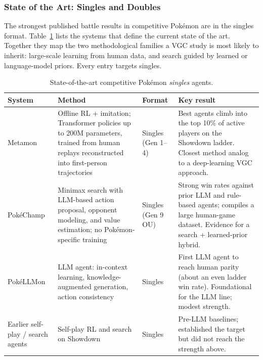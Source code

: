 \clearpage
\subsubsection{State of the Art: Singles and Doubles}
\label{subsec:singles}

The strongest published battle results in competitive Pok\'{e}mon are in the
singles format. Table~\ref{tab:singles} lists the systems that define the current
state of the art. Together they map the two methodological families a VGC study
is most likely to inherit: large-scale learning from human data, and search
guided by learned or language-model priors. Every entry targets singles.

\begin{table}[ht]
\small
\tablespacing
\begin{tabularx}{\textwidth}{@{}>{\hsize=0.62\hsize\raggedright\arraybackslash}X
                                >{\hsize=1.30\hsize\raggedright\arraybackslash}X
                                >{\hsize=0.58\hsize\raggedright\arraybackslash}X
                                >{\hsize=1.50\hsize\raggedright\arraybackslash}X@{}}
\toprule
\textbf{System} & \textbf{Method} & \textbf{Format} & \textbf{Key result} \\
\midrule
Metamon \cite{grigsby2025metamon}
  & Offline RL + imitation; Transformer policies up to 200M parameters, trained
    from human replays reconstructed into first-person trajectories
  & Singles (Gen 1--4)
  & Best agents climb into the top 10\% of active players on the Showdown ladder.
    Closest method analog to a deep-learning VGC approach. \\
\addlinespace
Pok\'{e}Champ \cite{karten2025pokechamp}
  & Minimax search with LLM-based action proposal, opponent modeling, and value
    estimation; no Pok\'{e}mon-specific training
  & Singles (Gen 9 OU)
  & Strong win rates against prior LLM and rule-based agents; compiles a large
    human-game dataset. Evidence for a search + learned-prior hybrid. \\
\addlinespace
Pok\'{e}LLMon \cite{hu2024pokellmon}
  & LLM agent: in-context learning, knowledge-augmented generation, action
    consistency
  & Singles
  & First LLM agent to reach human parity (about an even ladder win rate).
    Foundational for the LLM line; modest strength. \\
\addlinespace
Earlier self-play / search agents \cite{lee2017showdown}
  & Self-play RL and search on Showdown
  & Singles
  & Pre-LLM baselines; established the target but did not reach the strength
    above. \\
\bottomrule
\end{tabularx}
\caption{State-of-the-art competitive Pok\'{e}mon \emph{singles} agents.}
\label{tab:singles}
\end{table}

